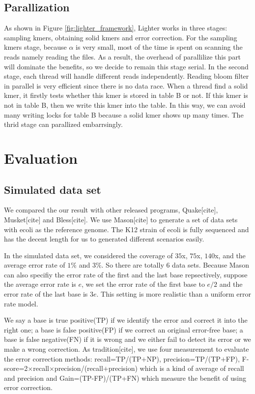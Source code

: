 \documentclass[10pt]{article}
\begin{document}
\subsection*{Parallization}
As shown in Figure \ref{fig:lighter_framework}, Lighter works in three stages: sampling kmers, obtaining solid kmers and error correction. For the sampling kmers stage, because $\alpha$ is very small, most of the time is spent on scanning the reads namely reading the files. As a result, the overhead of parallilize this part will dominate the benefits, so we decide to remain this stage serial. In the second stage, each thread will handle different reads independently. Reading bloom filter in parallel is very efficient since there is no data race. When a thread find a solid kmer, it firstly tests whether this kmer is stored in table B or not. If this kmer is not in table B, then we write this kmer into the table. In this way, we can avoid many writing locks for table B because a solid kmer shows up many times. The thrid stage can parallized embarrsingly.

\section*{Evaluation}
\subsection*{Simulated data set}
We compared the our result with other released programs, Quake[cite], Musket[cite] and Bless[cite]. We use Mason[cite] to generate a set of data sets with ecoli as the reference genome. The K12 strain of ecoli is fully sequenced and has the decent length for us to generated different scenarios easily. 

In the simulated data set, we considered the coverage of $35$x, $75$x, $140$x, and the average error rate of $1\%$ and $3\%$. So there are totally 6 data sets. Because Mason can also specifiy the error rate of the first and the last base repsectively, suppose the average error rate is $e$, we set the error rate of the first base to $e/2$ and the error rate of the last base is $3e$. This setting is more realistic than a uniform error rate model. 

We say a base is true positive(TP) if we identify the error and correct it into the right one; a base is false positive(FP) if we correct an original error-free base; a base is false negative(FN) if it is wrong and we either fail to detect its error or we make a wrong correction. As tradition[cite], we use four measurement to evaluate the error correction methods: recall=TP/(TP$+$NP), precision=TP/(TP$+$FP), F-score=2$\times$recall$\times$precision/(recall$+$precision) which is a kind of average of recall and precision and Gain=(TP-FP)/(TP+FN) which measure the benefit of using error correction.
\end{document}

